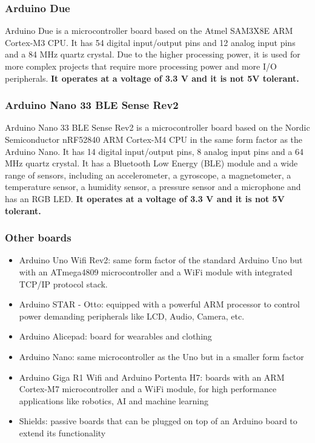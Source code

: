 \subsubsection*{Arduino Due}
Arduino Due is a microcontroller board based on the Atmel SAM3X8E ARM Cortex-M3 CPU. It has 54 digital input/output pins and 12
analog input pins and a 84 MHz quartz crystal. Due to the higher processing power, it is used for more complex projects that
require more processing power and more I/O peripherals. \textbf{It operates at a voltage of 3.3 V and it is not 5V tolerant.}

\subsubsection*{Arduino Nano 33 BLE Sense Rev2}
Arduino Nano 33 BLE Sense Rev2 is a microcontroller board based on the Nordic Semiconductor nRF52840 ARM Cortex-M4 CPU in the
same form factor as the Arduino Nano. It has 14 digital input/output pins, 8 analog input pins and a 64 MHz quartz crystal.
It has a Bluetooth Low Energy (BLE) module and a wide range of sensors, including an accelerometer, a gyroscope, a magnetometer,
a temperature sensor, a humidity sensor, a pressure sensor and a microphone and has an RGB LED. \textbf{It operates at a voltage
of 3.3 V and it is not 5V tolerant.}

\subsubsection*{Other boards}
\begin{itemize}
	\item Arduino Uno Wifi Rev2: same form factor of the standard Arduino Uno but with an ATmega4809 microcontroller and a
	WiFi module with integrated TCP/IP protocol stack.
	\item Arduino STAR - Otto: equipped with a powerful ARM processor to control power demanding peripherals like LCD, Audio, Camera, etc.
	\item Arduino Alicepad: board for wearables and clothing
	\item Arduino Nano: same microcontroller as the Uno but in a smaller form factor
	\item Arduino Giga R1 Wifi and Arduino Portenta H7: boards with an ARM Cortex-M7 microcontroller and a WiFi module,
	for high performance applications like robotics, AI and machine learning
	\item Shields: passive boards that can be plugged on top of an Arduino board to extend its functionality
\end{itemize}

